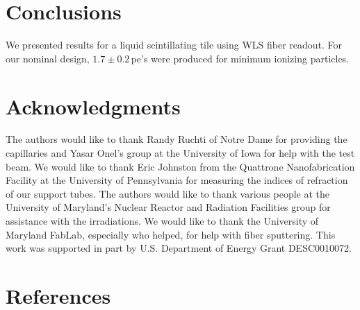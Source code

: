 \documentclass[review]{elsarticle}
\begin{document}
\section{Conclusions}

We presented results for a liquid scintillating tile using WLS fiber readout. For our nominal design, $1.7\pm 0.2$\,pe's
were produced for minimum ionizing particles.

\section{Acknowledgments}
The authors would like to thank Randy Ruchti of Notre Dame for
providing the capillaries and Yasar Onel's group at the University of
Iowa for help with the test beam. We would like to thank Eric
Johnston from the Quattrone Nanofabrication Facility at the University
of Pennsylvania for measuring the indices of refraction of our support
tubes. 
The authors would like to thank {\color{red} various people} at
the University of Maryland's Nuclear Reactor and Radiation
Facilities group for assistance
with the irradiations.
 We would like to thank the University of Maryland
FabLab, especially {\color{red} who helped}, for help with fiber sputtering.
This work was supported in part by U.S. Department of Energy
Grant DESC0010072.

\section*{References}


\end{document}
